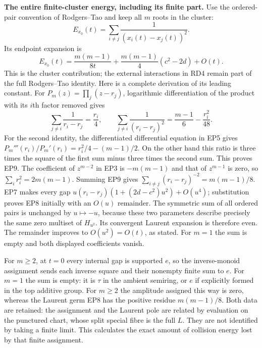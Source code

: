 \documentclass[11pt,a4paper]{article}
\theoremstyle{definition}\newtheorem{definition}[theorem]{Definition}
\begin{document}
\EP\textbf{The entire finite-cluster energy, including its finite part.}
Use the ordered-pair convention of Rodgers--Tao and keep all $m$
roots in the cluster:
\[
 E_{x_0}(t)=\sum_{i\ne j}\frac1{(x_i(t)-x_j(t))^2}.
\]
Its endpoint expansion is
\[
 \boxed{E_{x_0}(t)=\frac{m(m-1)}{8t}
       +\frac{m(m-1)}4(c^2-2d)+O(t).}
 \tag{EP8}\label{ep:energy}
\]
This is the cluster contribution; the external interactions in RD4
remain part of the full Rodgers--Tao identity.
Here is a complete derivation of its leading constant.
For $P_m(z)=\prod_j(z-r_j)$, logarithmic differentiation of the
product with its $i$th factor removed gives
\[
 \sum_{j\ne i}\frac1{r_i-r_j}=\frac{r_i}4,\qquad
 \sum_{j\ne i}\frac1{(r_i-r_j)^2}
            =\frac{m-1}6-\frac{r_i^2}{48}.
 \tag{EP9}
\]
For the second identity, the differentiated differential equation
in EP5 gives $P_m'''(r_i)/P_m'(r_i)=r_i^2/4-(m-1)/2$.
On the other hand this ratio is three times the square of the
first sum minus three times the second sum. This proves EP9.
The coefficient of $z^{m-2}$ in EP3 is $-m(m-1)$ and that of
$z^{m-1}$ is zero, so $\sum_i r_i^2=2m(m-1)$.
Summing EP9 gives $\sum_{i\ne j}(r_i-r_j)^{-2}=m(m-1)/8$.
EP7 makes every gap
$u(r_i-r_j)(1+(2d-c^2)u^2)+O(u^4)$; substitution proves EP8
initially with an $O(u)$ remainder. The symmetric sum of all
ordered pairs is unchanged by $u\mapsto-u$, because these two
parameters describe precisely the same zero multiset of $H_{u^2}$.
Its convergent Laurent expansion is therefore even. The remainder
improves to $O(u^2)=O(t)$, as stated.
For $m=1$ the sum is empty and both displayed coefficients vanish.

For $m\ge2$, at $t=0$ every internal gap is supported $e$, so the
inverse-monoid assignment sends each inverse square and their nonempty
finite sum to $e$. For $m=1$ the sum is empty: it is $\tau$ in the
ambient semiring, or $e$ if explicitly formed in the top additive group.
For $m\ge2$ the amplitude assigned this way is zero, whereas the
Laurent germ EP8 has the positive residue $m(m-1)/8$.
Both data are retained: the assignment and the Laurent pole are
related by evaluation on the punctured chart, whose split special
fibre is the full $L$. They are not identified by taking a finite
limit. This calculates the exact amount of collision energy lost
by that finite assignment.
\end{document}
